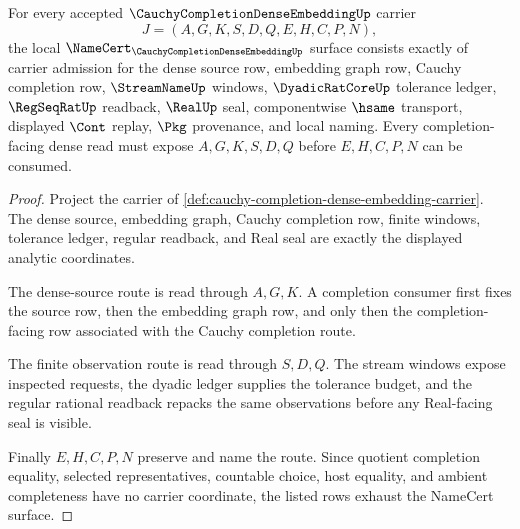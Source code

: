 \begin{theorem}
\label{thm:cauchy-completion-dense-embedding-namecert-obligations}
For every accepted $\CauchyCompletionDenseEmbeddingUp$ carrier
$$
J=(A,G,K,S,D,Q,E,H,C,P,N),
$$
the local $\NameCert_{\CauchyCompletionDenseEmbeddingUp}$ surface consists exactly of carrier admission for the dense source row, embedding graph row, Cauchy completion row, $\StreamNameUp$ windows, $\DyadicRatCoreUp$ tolerance ledger, $\RegSeqRatUp$ readback, $\RealUp$ seal, componentwise $\hsame$ transport, displayed $\Cont$ replay, $\Pkg$ provenance, and local naming. Every completion-facing dense read must expose $A,G,K,S,D,Q$ before $E,H,C,P,N$ can be consumed.
\end{theorem}
\begin{proof}
Project the carrier of \autoref{def:cauchy-completion-dense-embedding-carrier}. The dense source, embedding graph, Cauchy completion row, finite windows, tolerance ledger, regular readback, and Real seal are exactly the displayed analytic coordinates.

The dense-source route is read through $A,G,K$. A completion consumer first fixes the source row, then the embedding graph row, and only then the completion-facing row associated with the Cauchy completion route.

The finite observation route is read through $S,D,Q$. The stream windows expose inspected requests, the dyadic ledger supplies the tolerance budget, and the regular rational readback repacks the same observations before any Real-facing seal is visible.

Finally $E,H,C,P,N$ preserve and name the route. Since quotient completion equality, selected representatives, countable choice, host equality, and ambient completeness have no carrier coordinate, the listed rows exhaust the NameCert surface.
\end{proof}

